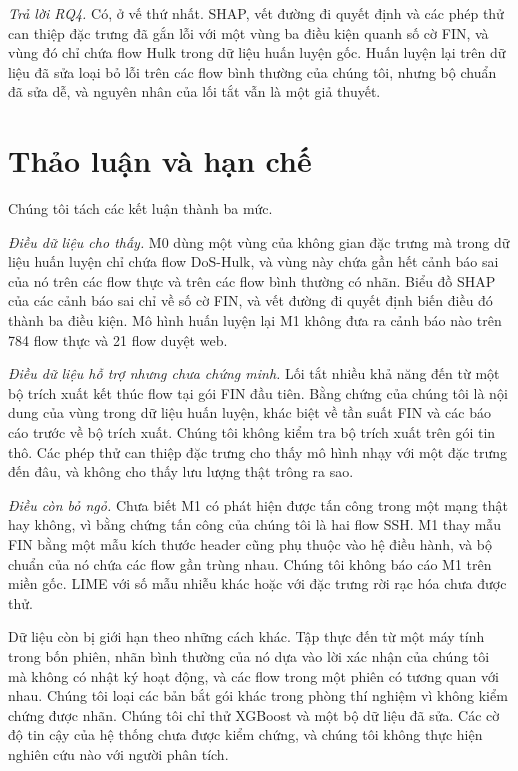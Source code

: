\documentclass[conference]{IEEEtran}
\begin{document}
\textit{Trả lời RQ4.} Có, ở vế thứ nhất. SHAP, vết đường đi quyết định và các phép thử can thiệp đặc trưng đã gắn lỗi với một vùng ba điều kiện quanh số cờ FIN, và vùng đó chỉ chứa flow Hulk trong dữ liệu huấn luyện gốc. Huấn luyện lại trên dữ liệu đã sửa loại bỏ lỗi trên các flow bình thường của chúng tôi, nhưng bộ chuẩn đã sửa dễ, và nguyên nhân của lối tắt vẫn là một giả thuyết.

\section{Thảo luận và hạn chế}
Chúng tôi tách các kết luận thành ba mức.

\textit{Điều dữ liệu cho thấy.} M0 dùng một vùng của không gian đặc trưng mà trong dữ liệu huấn luyện chỉ chứa flow DoS-Hulk, và vùng này chứa gần hết cảnh báo sai của nó trên các flow thực và trên các flow bình thường có nhãn. Biểu đồ SHAP của các cảnh báo sai chỉ về số cờ FIN, và vết đường đi quyết định biến điều đó thành ba điều kiện. Mô hình huấn luyện lại M1 không đưa ra cảnh báo nào trên 784 flow thực và 21 flow duyệt web.

\textit{Điều dữ liệu hỗ trợ nhưng chưa chứng minh.} Lối tắt nhiều khả năng đến từ một bộ trích xuất kết thúc flow tại gói FIN đầu tiên. Bằng chứng của chúng tôi là nội dung của vùng trong dữ liệu huấn luyện, khác biệt về tần suất FIN và các báo cáo trước về bộ trích xuất. Chúng tôi không kiểm tra bộ trích xuất trên gói tin thô. Các phép thử can thiệp đặc trưng cho thấy mô hình nhạy với một đặc trưng đến đâu, và không cho thấy lưu lượng thật trông ra sao.

\textit{Điều còn bỏ ngỏ.} Chưa biết M1 có phát hiện được tấn công trong một mạng thật hay không, vì bằng chứng tấn công của chúng tôi là hai flow SSH. M1 thay mẫu FIN bằng một mẫu kích thước header cũng phụ thuộc vào hệ điều hành, và bộ chuẩn của nó chứa các flow gần trùng nhau. Chúng tôi không báo cáo M1 trên miền gốc. LIME với số mẫu nhiễu khác hoặc với đặc trưng rời rạc hóa chưa được thử.

Dữ liệu còn bị giới hạn theo những cách khác. Tập thực đến từ một máy tính trong bốn phiên, nhãn bình thường của nó dựa vào lời xác nhận của chúng tôi mà không có nhật ký hoạt động, và các flow trong một phiên có tương quan với nhau. Chúng tôi loại các bản bắt gói khác trong phòng thí nghiệm vì không kiểm chứng được nhãn. Chúng tôi chỉ thử XGBoost và một bộ dữ liệu đã sửa. Các cờ độ tin cậy của hệ thống chưa được kiểm chứng, và chúng tôi không thực hiện nghiên cứu nào với người phân tích.
\end{document}
